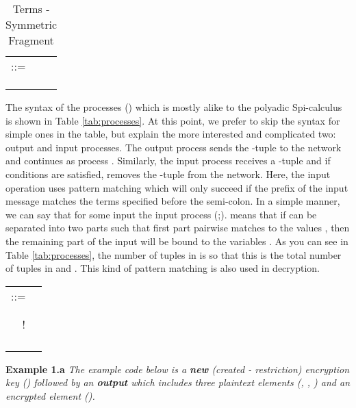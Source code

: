 \begin{table}\caption{\LYSA Terms - Symmetric Fragment}
\label{tab:terms}
\centering
\begin{tabular}{rlll}
\hline
\multicolumn{2}{l}{ ::=}  \\
              &                                                &   \\
  &                                                &   \\
  &   &   \\
\hline
\end{tabular}
\end{table}
The syntax of the processes () which is mostly alike to the polyadic Spi-calculus \cite{aba:gor} is shown in Table \ref{tab:processes}. 
At this point, we prefer to skip the syntax for simple ones in the table, but explain the more interested and complicated two: output and input processes. 
The output process  sends the -tuple  to the network and continues as process .
Similarly, the input process  receives a -tuple  and if conditions are satisfied, removes the -tuple from the network.
Here, the input operation uses pattern matching which will only succeed if the prefix of the input message matches the terms specified before the semi-colon. 
In a simple manner, we can say that for some input  the input process (;). means that 
if  can be separated into two parts such that first part pairwise matches to the values , then the remaining part of the input will be bound to the variables . 
As you can see in Table \ref{tab:processes}, the number of tuples in  is  so that this is the total number of tuples in  and . 
This kind of pattern matching is also used in decryption. 

\begin{table*}\caption{\LYSA Processes - Symmetric Fragment}
\label{tab:processes}
\centering
\begin{tabular}{lll}
\hline
\multicolumn{2}{l}{ ::=}  \\
             &                                                              &  \\
 &                                                  &  \\
 & !                                                           & \\
 &                                                     & \\
 &                                        & \\
 &                        & \\
 &     & \\
\hline
\end{tabular}
\end{table*}
\textbf{Example 1.a}  \textit{The example \LYSA code below is a \textbf{new} (created - restriction) encryption key () followed by an \textbf{output} which includes three plaintext elements (, , ) and an encrypted element ().}
\begin{center}\end{center} 

